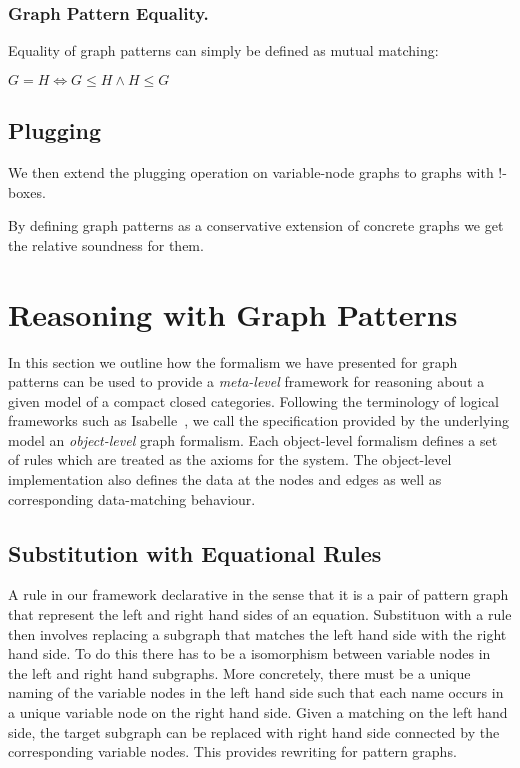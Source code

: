\documentclass[runningheads]{llncs}
\begin{document}
\subsubsection{Graph Pattern Equality.}

Equality of graph patterns can simply be defined as mutual matching: 

\begin{definition}
  $G = H \Leftrightarrow G \leq H \land H \leq G$
\end{definition}


\subsection{Plugging}

We then extend the plugging
operation on variable-node graphs to graphs with !-boxes.


By defining graph patterns as a conservative extension of concrete
graphs we get the relative soundness for them.



\section{Reasoning with Graph Patterns}
\label{sec:rewriting}

In this section we outline how the formalism we have presented for
graph patterns can be used to provide a \emph{meta-level} framework
for reasoning about a given model of a compact closed
categories. Following the terminology of logical frameworks such as
Isabelle~\cite{isabelle}, we call the specification provided by the
underlying model an \emph{object-level} graph formalism. Each
object-level formalism defines a set of rules which are treated as the
axioms for the system. The object-level implementation also defines
the data at the nodes and edges as well as corresponding data-matching
behaviour. 

\subsection{Substitution with Equational Rules}

A rule in our framework declarative in the sense that it is a pair of
pattern graph that represent the left and right hand sides of an
equation. Substituon with a rule then involves replacing a subgraph
that matches the left hand side with the right hand side. To do this
there has to be a isomorphism between variable nodes in the left and
right hand subgraphs. More concretely, there must be a unique naming
of the variable nodes in the left hand side such that each name occurs
in a unique variable node on the right hand side. Given a matching on
the left hand side, the target subgraph can be replaced with right
hand side connected by the corresponding variable nodes. This provides
rewriting for pattern graphs.
\end{document}

